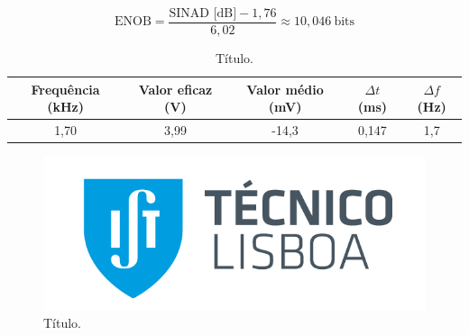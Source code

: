 
\vspace{-0.3cm}
\begin{equation}
    \text{ENOB} = \frac{\text{SINAD [dB]} - 1,76}{6,02} \approx 10,046\:\text{bits}
    \label{eq:exemplo}
\end{equation}


\begin{table}[H]
    \centering
    \caption{Título.}
    \label{tab:exemplo}
    \begin{tabular}{|c|c|c|c|c|}
    \hline
    \cellcolor[HTML]{EFEFEF} Frequência (kHz)   &  \cellcolor[HTML]{EFEFEF} Valor eficaz (V) & \cellcolor[HTML]{EFEFEF} Valor médio (mV) &\cellcolor[HTML]{EFEFEF} $\Delta t$ (ms) & \cellcolor[HTML]{EFEFEF} $\Delta f$ (Hz) \\ \hline
     1,70     & 3,99 & -14,3 & 0,147 & 1,7    \\ \hline
    \end{tabular}
\end{table}


\begin{figure}[H]
    \centering
    \includegraphics[scale = 0.6]{imagens/ist.png} 
    \caption{Título.}
    \label{fig:exemplo.1}
\end{figure}
\vspace{-0.2cm}


